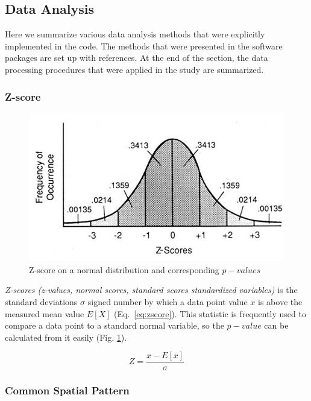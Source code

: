 \documentclass[14pt,a4paper]{scrartcl}
\begin{document}
\subsection{Data Analysis}
\label{sec:Methods:Data{} Analysis}

Here we summarize various data analysis methods that were explicitly implemented in the code. The methods that were presented in the software packages are set up with references. At the end of the section, the data processing procedures that were applied in the study are summarized. 

\subsubsection{Z-score}
\label{sec:Methods:Data Analysis:Z-score}

\begin{figure}[H]
\centering
\includegraphics[width=0.7\linewidth]{z-scores.jpg}
\caption{Z-score on a normal distribution and corresponding $p-values$}\label{fig:z-scores.jpg}
\end{figure}

\textit{Z-scores (z-values, normal scores, standard scores standardized variables)} is the standard deviations $\sigma$ signed number by which a data point value $x$ is above the measured mean value $E[X]$ (Eq.~\ref{eq:zscore}). This statistic is frequently used to compare a data point to a standard normal variable, so the $p-value$ can be calculated from it easily (Fig. \ref{fig:z-scores.jpg}). 

\begin{equation} \label{eq:zscore}
Z = \frac{x - E[x]}{\sigma}
\end{equation}

\subsubsection{Common Spatial Pattern}
\label{sec:Methods:Data Analysis:Common Spatial Pattern}
\end{document}
